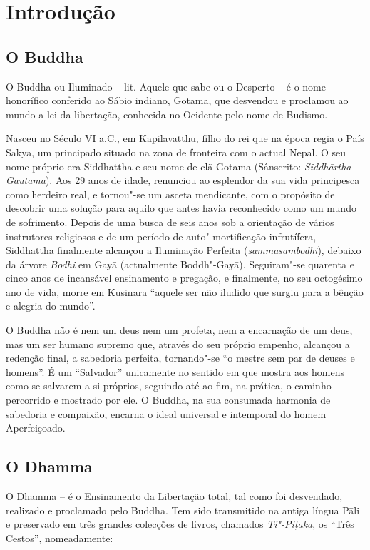 \chapter{Introdução}

\section{O Buddha}

O Buddha ou Iluminado -- lit. Aquele que sabe ou o Desperto -- é o nome
honorífico conferido ao Sábio indiano, Gotama, que desvendou e proclamou ao
mundo a lei da libertação, conhecida no Ocidente pelo nome de Budismo.

Nasceu no Século VI a.C., em Kapilavatthu, filho do rei que na época regia o
País Sakya, um principado situado na zona de fronteira com o actual Nepal. O seu
nome próprio era Siddhattha e seu nome de clã Gotama (Sânscrito:
\emph{Siddhārtha Gautama}). Aos 29 anos de idade, renunciou ao esplendor da sua
vida principesca como herdeiro real, e tornou"-se um asceta mendicante, com o
propósito de descobrir uma solução para aquilo que antes havia reconhecido como
um mundo de sofrimento. Depois de uma busca de seis anos sob a orientação de
vários instrutores religiosos e de um período de auto"-mortificação infrutífera,
Siddhattha finalmente alcançou a Iluminação Perfeita (\emph{sammāsambodhi}),
debaixo da árvore \emph{Bodhi} em Gayā (actualmente Boddh"-Gayā). Seguiram"-se
quarenta e cinco anos de incansável ensinamento e pregação, e finalmente, no seu
octogésimo ano de vida, morre em Kusinara ``aquele ser não iludido que surgiu
para a bênção e alegria do mundo''.

O Buddha não é nem um deus nem um profeta, nem a encarnação de um deus, mas um
ser humano supremo que, através do seu próprio empenho, alcançou a redenção
final, a sabedoria perfeita, tornando"-se ``o mestre sem par de deuses e
homens''. É um ``Salvador'' unicamente no sentido em que mostra aos homens como
se salvarem a si próprios, seguindo até ao fim, na prática, o caminho percorrido
e mostrado por ele. O Buddha, na sua consumada harmonia de sabedoria e
compaixão, encarna o ideal universal e intemporal do homem Aperfeiçoado.

\section{O Dhamma}

O Dhamma -- é o Ensinamento da Libertação total, tal como foi desvendado, realizado e proclamado pelo Buddha. Tem sido transmitido na antiga língua Pāli e preservado em três grandes colecções de livros, chamados \emph{Ti"-Piṭaka}, os ``Três Cestos'', nomeadamente:

